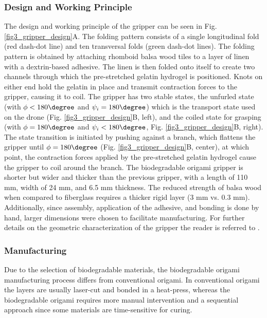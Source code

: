\subsubsection{Design and Working Principle}
The design and working principle of the gripper can be seen in Fig. \ref{fig3_gripper_design}A. The folding pattern consists of a single longitudinal fold (red dash-dot line) and ten transversal folds (green dash-dot lines). The folding pattern is obtained by attaching rhomboid balsa wood tiles to a layer of linen with a dextrin-based adhesive. The linen is then folded onto itself to create two channels through which the pre-stretched gelatin hydrogel is positioned. Knots on either end hold the gelatin in place and transmit contraction forces to the gripper, causing it to coil. The gripper has two stable states, the unfurled state (with $\phi < 180\degree$ and $\psi_i =180\degree$) which is the transport state used on the drone (Fig. \ref{fig3_gripper_design}B, left), and the coiled state for grasping (with $\phi = 180\degree$ and $\psi_i < 180\degree$, Fig. \ref{fig3_gripper_design}B, right). The state transition is initiated by pushing against a branch, which flattens the gripper until $\phi = 180\degree$ (Fig. \ref{fig3_gripper_design}B, center), at which point, the contraction forces applied by the pre-stretched gelatin hydrogel cause the gripper to coil around the branch. The biodegradable origami gripper is shorter but wider and thicker than the previous gripper, with a length of 110 mm, width of 24 mm, and 6.5 mm thickness. The reduced strength of balsa wood when compared to fiberglass requires a thicker rigid layer (3 mm vs. 0.3 mm). Additionally, since assembly, application of the adhesive, and bonding is done by hand, larger dimensions were chosen to facilitate manufacturing. 
For further details on the geometric characterization of the gripper the reader is referred to \cite{Geckeler2022a}. 

\subsubsection{Manufacturing}
Due to the selection of biodegradable materials, the biodegradable origami manufacturing process differs from conventional origami. In conventional origami the layers are usually laser-cut and bonded in a heat-press, whereas the biodegradable origami requires more manual intervention and a sequential approach since some materials are time-sensitive for curing. 

